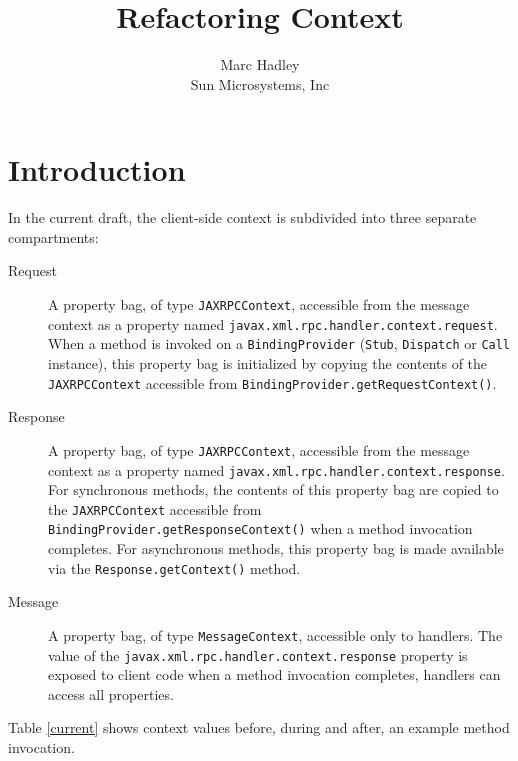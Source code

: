 \documentclass[11pt, dvipdfm]{article}
\title{Refactoring Context}
\author{Marc Hadley\\ Sun Microsystems, Inc}
\begin{document}
\newcommand{\code}[1]{\texttt{\small #1}}
\renewcommand\verbatimtabsize{4\relax}

\maketitle

\linenumbers

\section{Introduction}

In the current draft, the client-side context is subdivided into three separate compartments:

\begin{description}
\item[Request] A property bag, of type \code{JAXRPCContext}, accessible from the message context as a property named \code{javax\-.xml\-.rpc\-.handler\-.context\-.request}. When a method is invoked on a \code{Binding\-Provider} (\code{Stub}, \code{Dispatch} or \code{Call} instance), this property bag is initialized by copying the contents of the \code{JAXRPCContext} accessible from \code{Binding\-Provider\-.get\-Request\-Context()}.

\item[Response] A property bag, of type \code{JAXRPCContext}, accessible from the message context as a property named \code{javax\-.xml\-.rpc\-.handler\-.context\-.response}. For synchronous methods, the contents of this property bag are copied to the \code{JAXRPCContext} accessible from \code{Binding\-Provider\-.get\-Response\-Context()} when a method invocation completes. For asynchronous methods, this property bag is made available via the \code{Response\-.get\-Context()} method.

\item[Message] A property bag, of type \code{MessageContext}, accessible only to handlers. The value of the \code{javax\-.xml\-.rpc\-.handler\-.context\-.response} property is exposed to client code when a method invocation completes, handlers can access all properties.
\end{description}

Table \ref{current} shows context values before, during and after, an example method invocation.
\end{document}
